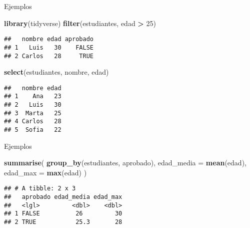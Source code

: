 \documentclass[
  ignorenonframetext,
]{beamer}
\newenvironment{Shaded}{\begin{snugshade}}{\end{snugshade}}
\newcommand{\AttributeTok}[1]{\textcolor[rgb]{0.13,0.29,0.53}{#1}}
\newcommand{\DecValTok}[1]{\textcolor[rgb]{0.00,0.00,0.81}{#1}}
\newcommand{\FunctionTok}[1]{\textcolor[rgb]{0.13,0.29,0.53}{\textbf{#1}}}
\newcommand{\NormalTok}[1]{#1}
\newcommand{\SpecialCharTok}[1]{\textcolor[rgb]{0.81,0.36,0.00}{\textbf{#1}}}
\begin{document}
\begin{frame}[fragile]{Ejemplos}
\label{ejemplos}
\begin{Shaded}
\begin{Highlighting}[]
\FunctionTok{library}\NormalTok{(tidyverse)}
\FunctionTok{filter}\NormalTok{(estudiantes, edad }\SpecialCharTok{\textgreater{}} \DecValTok{25}\NormalTok{)}
\end{Highlighting}
\end{Shaded}

\begin{verbatim}
##   nombre edad aprobado
## 1   Luis   30    FALSE
## 2 Carlos   28     TRUE
\end{verbatim}

\begin{Shaded}
\begin{Highlighting}[]
\FunctionTok{select}\NormalTok{(estudiantes, nombre, edad)}
\end{Highlighting}
\end{Shaded}

\begin{verbatim}
##   nombre edad
## 1    Ana   23
## 2   Luis   30
## 3  Marta   25
## 4 Carlos   28
## 5  Sofia   22
\end{verbatim}
\end{frame}

\begin{frame}[fragile]{Ejemplos}
\label{ejemplos-1}
\begin{Shaded}
\begin{Highlighting}[]
\FunctionTok{summarise}\NormalTok{(}
  \FunctionTok{group\_by}\NormalTok{(estudiantes, aprobado),}
  \AttributeTok{edad\_media =} \FunctionTok{mean}\NormalTok{(edad), }\AttributeTok{edad\_max =} \FunctionTok{max}\NormalTok{(edad)}
\NormalTok{  )}
\end{Highlighting}
\end{Shaded}

\begin{verbatim}
## # A tibble: 2 x 3
##   aprobado edad_media edad_max
##   <lgl>         <dbl>    <dbl>
## 1 FALSE          26         30
## 2 TRUE           25.3       28
\end{verbatim}
\end{frame}
\end{document}
